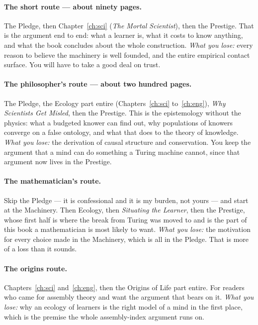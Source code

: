 \paragraph{The short route --- about ninety pages.}
The Pledge, then Chapter~\ref{ch:sci} (\emph{The Mortal
Scientist}), then the Prestige.
That is the argument end to end: what a learner is, what it costs
to know anything, and what the book concludes about the whole
construction.
\emph{What you lose:} every reason to believe the machinery is well
founded, and the entire empirical contact surface.
You will have to take a good deal on trust.

\paragraph{The philosopher's route --- about two hundred pages.}
The Pledge, the Ecology part entire (Chapters~\ref{ch:sci}
to~\ref{ch:eng}), \emph{Why Scientists Get Misled}, then the
Prestige.
This is the epistemology without the physics: what a budgeted
knower can find out, why populations of knowers converge on a false
ontology, and what that does to the theory of knowledge.
\emph{What you lose:} the derivation of causal structure and
conservation.
You keep the argument that a mind can do something a Turing machine
cannot, since that argument now lives in the Prestige.

\paragraph{The mathematician's route.}
Skip the Pledge --- it is confessional and it is my burden, not
yours --- and start at the Machinery.
Then Ecology, then \emph{Situating the Learner}, then the Prestige,
whose first half is where the break from Turing was moved to and is the
part of this book a mathematician is most likely to want.
\emph{What you lose:} the motivation for every choice made in the
Machinery, which is all in the Pledge.
That is more of a loss than it sounds.

\paragraph{The origins route.}
Chapters~\ref{ch:sci} and~\ref{ch:eng}, then the Origins of Life
part entire.
For readers who came for assembly theory and want the argument that
bears on it.
\emph{What you lose:} why an ecology of learners is the right model
of a mind in the first place, which is the premise the whole
assembly-index argument runs on.

